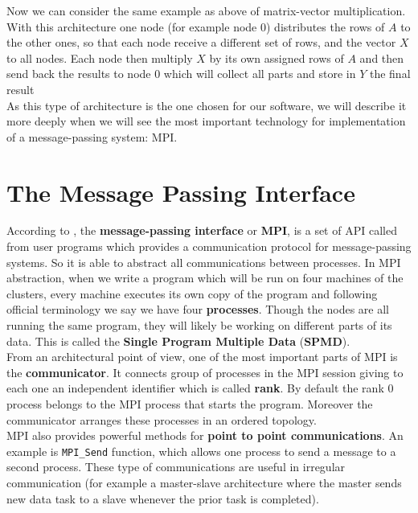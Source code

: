 Now we can consider the same example as above of matrix-vector multiplication. With this architecture one node (for example node $0$) distributes the rows of $A$ to the other ones, so that each node receive a different set of rows, and the vector $X$ to all nodes. Each node then multiply $X$ by its own assigned rows of $A$ and then send back the results to node $0$ which will collect all parts and store in $Y$ the final result\\

As this type of architecture is the one chosen for our software, we will describe it more deeply when we will see the most important technology for implementation of a message-passing system: MPI.

\section{The Message Passing Interface}\label{sec22:MPI}

According to \cite{Matloff}, the \textbf{message-passing interface} or \textbf{MPI}, is a set of API called from user programs which provides a communication protocol for message-passing systems. So it is able to abstract all communications between processes. In MPI abstraction, when we write a program which will be run on four machines of the clusters, every machine  executes its own copy of the program and following official terminology we say we have four \textbf{processes}. Though the nodes are all running the same program, they will likely be working on different parts of its data. This is called the \textbf{Single Program Multiple Data} (\textbf{SPMD}).\\

From an architectural point of view, one of the most important parts of MPI is the \textbf{communicator}. It connects group of processes in the MPI session giving to each one an independent identifier which is called \textbf{rank}. By default the rank 0 process belongs to the MPI process that starts the program. Moreover the communicator arranges these processes in an ordered topology.\\

MPI also provides powerful methods for \textbf{point to point communications}. An example is \texttt{MPI\_Send} function, which allows one process to send a message to a second process. These type of communications are useful in irregular communication (for example a master-slave architecture where the master sends new data task to a slave whenever the prior task is completed).\\

